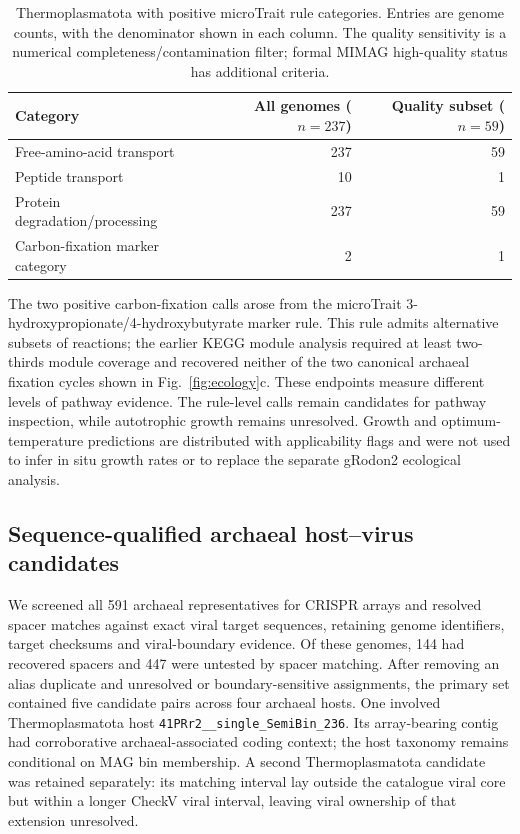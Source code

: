 \begin{table}[htbp]\centering\small
\caption{Thermoplasmatota with positive microTrait rule categories. Entries are genome counts, with the denominator shown in each column. The quality sensitivity is a numerical completeness/contamination filter; formal MIMAG high-quality status has additional criteria.}
\label{tab:microtrait_thermo}
\begin{tabular}{lrr}\toprule
Category & All genomes ($n=237$) & Quality subset ($n=59$)\\\midrule
Free-amino-acid transport & 237 & 59\\
Peptide transport & 10 & 1\\
Protein degradation/processing & 237 & 59\\
Carbon-fixation marker category & 2 & 1\\\bottomrule
\end{tabular}
\end{table}

The two positive carbon-fixation calls arose from the microTrait 3-hydroxypropionate/4-hydroxybutyrate marker rule. This rule admits alternative subsets of reactions; the earlier KEGG module analysis required at least two-thirds module coverage and recovered neither of the two canonical archaeal fixation cycles shown in Fig.~\ref{fig:ecology}c. These endpoints measure different levels of pathway evidence. The rule-level calls remain candidates for pathway inspection, while autotrophic growth remains unresolved. Growth and optimum-temperature predictions are distributed with applicability flags and were not used to infer in situ growth rates or to replace the separate gRodon2 ecological analysis.

\subsection*{Sequence-qualified archaeal host--virus candidates}

We screened all 591 archaeal representatives for CRISPR arrays and resolved spacer matches against exact viral target sequences, retaining genome identifiers, target checksums and viral-boundary evidence. Of these genomes, 144 had recovered spacers and 447 were untested by spacer matching. After removing an alias duplicate and unresolved or boundary-sensitive assignments, the primary set contained five candidate pairs across four archaeal hosts. One involved Thermoplasmatota host \texttt{41PRr2\_\_single\_SemiBin\_236}. Its array-bearing contig had corroborative archaeal-associated coding context; the host taxonomy remains conditional on MAG bin membership. A second Thermoplasmatota candidate was retained separately: its matching interval lay outside the catalogue viral core but within a longer CheckV viral interval, leaving viral ownership of that extension unresolved.

